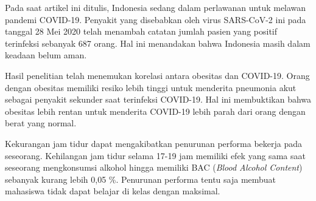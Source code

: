 \documentclass[12pt, a4paper, twoside]{article}
\begin{document}
Pada saat artikel ini ditulis, Indonesia sedang dalam perlawanan untuk melawan pandemi COVID-19. Penyakit yang disebabkan oleh virus SARS-CoV-2 ini pada tanggal 28 Mei 2020 telah menambah catatan jumlah pasien yang positif terinfeksi sebanyak 687 orang. Hal ini menandakan bahwa Indonesia masih dalam keadaan belum aman. \cite{Putri.2020} 

Hasil penelitian telah menemukan korelasi antara obesitas dan COVID-19. Orang dengan obesitas memiliki resiko lebih tinggi untuk menderita pneumonia akut sebagai penyakit sekunder saat terinfeksi COVID-19. Hal ini membuktikan bahwa obesitas lebih rentan untuk menderita COVID-19 lebih parah dari orang dengan berat yang normal. \cite{Cai.2020}

Kekurangan jam tidur dapat mengakibatkan penurunan performa bekerja pada seseorang. Kehilangan jam tidur selama 17-19 jam memiliki efek yang sama saat seseorang mengkonsumsi alkohol hingga memiliki BAC (\textit{Blood Alcohol Content}) sebanyak kurang lebih 0,05 \%. Penurunan performa tentu saja membuat mahasiswa tidak dapat belajar di kelas dengan maksimal. \cite{Williamson.2000}

\printbibliography[title = Daftar Pustaka]
\end{document}
